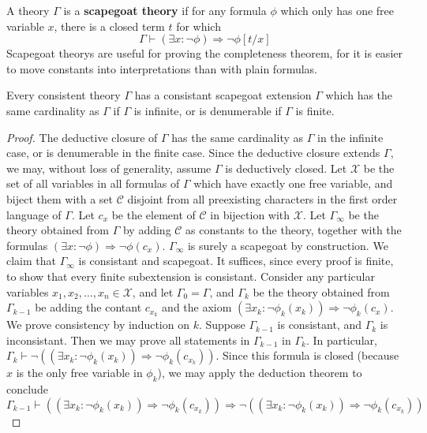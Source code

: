A theory $\Gamma$ is a {\bf scapegoat theory} if for any formula $\phi$ which only has one free variable $x$, there is a closed term $t$ for which
%
\[ \Gamma \vdash (\exists x: \neg \phi) \Rightarrow \neg \phi[t/x] \]
%
Scapegoat theorys are useful for proving the completeness theorem, for it is easier to move constants into interpretations than with plain formulas.

\begin{lemma}
    Every consistent theory $\Gamma$ has a consistant scapegoat extension $\Gamma$ which has the same cardinality as $\Gamma$ if $\Gamma$ is infinite, or is denumerable if $\Gamma$ is finite.
\end{lemma}
\begin{proof}
    The deductive closure of $\Gamma$ has the same cardinality as $\Gamma$ in the infinite case, or is denumerable in the finite case. Since the deductive closure extends $\Gamma$, we may, without loss of generality, assume $\Gamma$ is deductively closed. Let $\mathcal{X}$ be the set of all variables in all formulas of $\Gamma$ which have exactly one free variable, and biject them with a set $\mathcal{C}$ disjoint from all preexisting characters in the first order language of $\Gamma$. Let $c_x$ be the element of $\mathcal{C}$ in bijection with $\mathcal{X}$. Let $\Gamma_\infty$ be the theory obtained from $\Gamma$ by adding $\mathcal{C}$ as constants to the theory, together with the formulas $(\exists x: \neg \phi) \Rightarrow \neg \phi(c_x)$. $\Gamma_\infty$ is surely a scapegoat by construction. We claim that $\Gamma_\infty$ is consistant and scapegoat. It suffices, since every proof is finite, to show that every finite subextension is consistant. Consider any particular variables $x_1, x_2, \dots, x_n \in \mathcal{X}$, and let $\Gamma_0 = \Gamma$, and $\Gamma_k$ be the theory obtained from $\Gamma_{k-1}$ be adding the contant $c_{x_k}$ and the axiom $(\exists x_k: \neg \phi_k(x_k)) \Rightarrow \neg \phi_k(c_x)$. We prove consistency by induction on $k$. Suppose $\Gamma_{k-1}$ is consistant, and $\Gamma_k$ is inconsistant. Then we may prove all statements in $\Gamma_{k-1}$ in $\Gamma_k$. In particular, $\Gamma_k \vdash \neg ((\exists x_k: \neg \phi_k(x_k)) \Rightarrow \neg \phi_k(c_{x_k}))$. Since this formula is closed (because $x$ is the only free variable in $\phi_k$), we may apply the deduction theorem to conclude
    \[ \Gamma_{k-1} \vdash ((\exists x_k: \neg \phi_k(x_k)) \Rightarrow \neg \phi_k(c_{x_k})) \Rightarrow \neg ((\exists x_k: \neg \phi_k(x_k)) \Rightarrow \neg \phi_k(c_{x_k})) \]

\end{proof}
